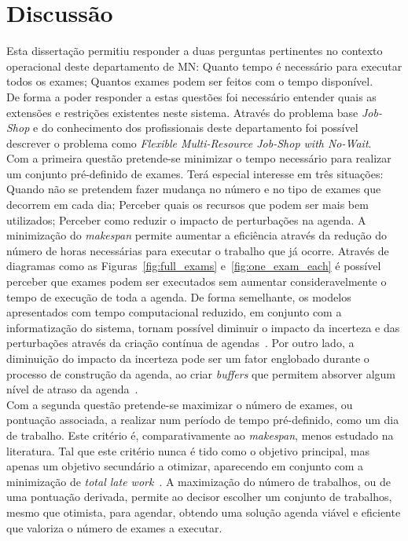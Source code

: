 \section{Discussão}

Esta dissertação permitiu responder a duas perguntas pertinentes no contexto operacional deste departamento de MN: Quanto tempo é necessário para executar todos os exames; Quantos exames podem ser feitos com o tempo disponível.\\

De forma a poder responder a estas questões foi necessário entender quais as extensões e restrições existentes neste sistema. Através do problema base \textit{Job-Shop} e do conhecimento dos profissionais deste departamento foi possível descrever o problema como \textit{Flexible Multi-Resource Job-Shop with No-Wait}.\\

Com a primeira questão pretende-se minimizar o tempo necessário para realizar um conjunto pré-definido de exames. Terá especial interesse em três situações: Quando não se pretendem fazer mudança no número e no tipo de exames que decorrem em cada dia; Perceber quais os recursos que podem ser mais bem utilizados; Perceber como reduzir o impacto de perturbações na agenda. A minimização do \textit{makespan} permite aumentar a eficiência através da redução do número de horas necessárias para executar o trabalho que já ocorre. Através de diagramas como as Figuras~\ref{fig:full_exams} e~\ref{fig:one_exam_each} é possível perceber que exames podem ser executados sem aumentar consideravelmente o tempo de execução de toda a agenda. De forma semelhante, os modelos apresentados com tempo computacional reduzido, em conjunto com a informatização do sistema, tornam possível diminuir o impacto da incerteza e das perturbações através da criação contínua de agendas~\cite{sprattRealtimeReactiveFramework2021a}. Por outro lado, a diminuição do impacto da incerteza pode ser um fator englobado durante o processo de construção da agenda, ao criar \textit{buffers} que permitem absorver algum nível de atraso da agenda~\cite{aschauerEfficientSchedulingStochastic2020}.\\

Com a segunda questão pretende-se maximizar o número de exames, ou pontuação associada, a realizar num período de tempo pré-definido, como um dia de trabalho. Este critério é, comparativamente ao \textit{makespan}, menos estudado na literatura. Tal que este critério nunca é tido como o objetivo principal, mas apenas um objetivo secundário a otimizar, aparecendo em conjunto com a minimização de \textit{total late work}~\cite{mosheiovMinimizingTotalLate2021}. A maximização do número de trabalhos, ou de uma pontuação derivada, permite ao decisor escolher um conjunto de trabalhos, mesmo que otimista, para agendar, obtendo uma solução agenda viável e eficiente que valoriza o número de exames a executar.\\

